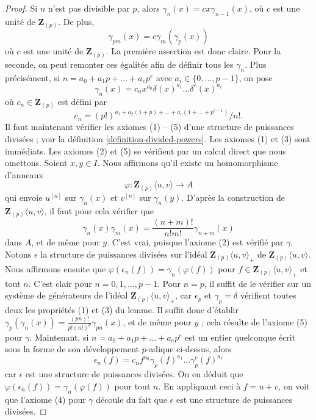 \begin{proof}
Si $n$ n'est pas divisible par $p$, alors
$\gamma_n(x) = c x \gamma_{n - 1}(x)$, où $c$ est une unité de
$\mathbf{Z}_{(p)}$. De plus,
$$
\gamma_{pm}(x) = c \gamma_m(\gamma_p(x))
$$
où $c$ est une unité de $\mathbf{Z}_{(p)}$. La première assertion est donc
claire. Pour la seconde, on peut remonter ces égalités afin de définir tous
les $\gamma_n$. Plus précisément, si
$n = a_0 + a_1p + \ldots + a_e p^e$ avec $a_i \in \{0, \ldots, p - 1\}$,
on pose
$$
\gamma_n(x) = c_n x^{a_0} \delta(x)^{a_1} \ldots \delta^e(x)^{a_e}
$$
où $c_n \in \mathbf{Z}_{(p)}$ est défini par
$$
c_n =
{(p!)^{a_1 + a_2(1 + p) + \ldots + a_e(1 + \ldots + p^{e - 1})}}/{n!}.
$$
Il faut maintenant vérifier les axiomes (1) -- (5) d'une structure de
puissances divisées ; voir la définition
\ref{definition-divided-powers}. Les axiomes (1) et (3) sont immédiats.
Les axiomes (2) et (5) se vérifient par un calcul direct que nous omettons.
Soient $x, y \in I$. Nous affirmons qu'il existe un homomorphisme d'anneaux
$$
\varphi : \mathbf{Z}_{(p)}\langle u, v \rangle \longrightarrow A
$$
qui envoie $u^{[n]}$ sur $\gamma_n(x)$ et $v^{[n]}$ sur $\gamma_n(y)$.
D'après la construction de $\mathbf{Z}_{(p)}\langle u, v \rangle$, il faut
pour cela vérifier que
$$
\gamma_n(x)\gamma_m(x) = \frac{(n + m)!}{n!m!} \gamma_{n + m}(x)
$$
dans $A$, et de même pour $y$. C'est vrai, puisque l'axiome (2) est vérifié
par $\gamma$. Notons $\epsilon$ la structure de puissances divisées sur
l'idéal $\mathbf{Z}_{(p)}\langle u, v\rangle_{+}$ de
$\mathbf{Z}_{(p)}\langle u, v\rangle$. Nous affirmons ensuite que
$\varphi(\epsilon_n(f)) = \gamma_n(\varphi(f))$
pour $f \in \mathbf{Z}_{(p)}\langle u, v\rangle_{+}$ et tout $n$.
C'est clair pour $n = 0, 1, \ldots, p - 1$. Pour $n = p$, il suffit de le
vérifier sur un système de générateurs de l'idéal
$\mathbf{Z}_{(p)}\langle u, v\rangle_{+}$, car $\epsilon_p$ et
$\gamma_p = \delta$ vérifient toutes deux les propriétés (1) et (3) du
lemme. Il suffit donc d'établir
$\gamma_p(\gamma_n(x)) = \frac{(pn)!}{p!(n!)^p}\gamma_{pn}(x)$, et de même
pour $y$ ; cela résulte de l'axiome (5) pour $\gamma$.
Maintenant, si $n = a_0 + a_1p + \ldots + a_e p^e$ est un entier quelconque
écrit sous la forme de son développement $p$-adique ci-dessus, alors
$$
\epsilon_n(f) =
c_n f^{a_0} \gamma_p(f)^{a_1} \ldots \gamma_p^e(f)^{a_e}
$$
car $\epsilon$ est une structure de puissances divisées. On en déduit que
$\varphi(\epsilon_n(f)) = \gamma_n(\varphi(f))$ pour tout $n$. En appliquant
ceci à $f = u + v$, on voit que l'axiome (4) pour $\gamma$ découle du fait
que $\epsilon$ est une structure de puissances divisées.
\end{proof}

